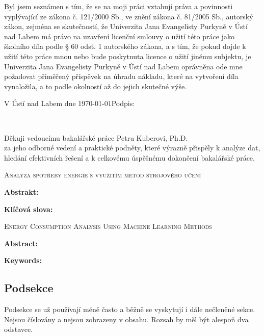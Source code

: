 \documentclass[male,czech,api_bc]{kitheses}
\newcommand{\nazevcz}{\ZT{Analýza spotřeby energie s využitím metod strojového učení}}        %
\newcommand{\nazeven}{\ZT{Energy Consumption Analysis Using Machine Learning Methods}}     %
\newcommand{\vedouciDAT}{\ZT{Petru Kuberovi, Ph.D.}}
\newcommand{\ZT}[1]{#1}
\begin{document}
\vspace{0.5em}

Byl jsem seznámen 
s tím, že se na moji práci vztahují práva a povinnosti vyplývající ze
zákona č. 121/2000 Sb., ve znění zákona č. 81/2005 Sb., autorský zákon, zejména se
skutečností, že Univerzita Jana Evangelisty Purkyně v Ústí nad Labem má právo na uzavření
licenční smlouvy o užití této práce jako školního díla podle § 60 odst. 1 autorského zákona, a
s tím, že pokud dojde k užití této práce mnou nebo bude poskytnuta licence o užití jinému
subjektu, je Univerzita Jana Evangelisty Purkyně v Ústí nad Labem oprávněna ode mne
požadovat přiměřený příspěvek na úhradu nákladu, které na vytvoření díla vynaložila, a to
podle okolností až do jejich skutečné výše.

\vspace{2em}

V Ústí nad Labem dne \today   \hfill Podpis: \makebox[4cm][s]{\dotfill}

\cleardoublepage
\thispagestyle{empty}
~
\vfill

\begin{flushright}
  Děkuji vedoucímu bakalářské práce \ZT{\vedouciDAT}\\
za jeho odborné vedení a praktické podněty, které výrazně přispěly k analýze dat, \\
hledání efektivních řešení a k celkovému úspěšnému dokončení bakalářské práce.


\end{flushright}

\cleardoublepage

\textsc{\nazevcz}

\textbf{Abstrakt:}


\textbf{Klíčová slova:} 


\bigskip


\textsc{\nazeven}

\textbf{Abstract:}


\textbf{Keywords:} 
\tableofcontents








 \subsection{Podsekce}
 Podsekce se už používají méně často a běžně se vyskytují i dále nečleněné sekce. Nejsou číslovány a nejsou zobrazeny v obsahu. Rozsah by měl být alespoň dva odstavce.
\end{document}
